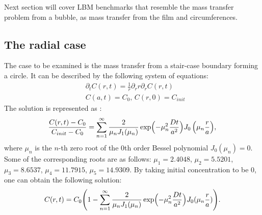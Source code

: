 \documentclass{article}
\newcommand{\beq}{\begin{equation}}
\newcommand{\feq}{\end{equation}}
\begin{document}
Next section will cover LBM benchmarks that resemble the mass transfer problem from a bubble, as 
mass transfer from the film  and circumferences.

\subsection{The radial case}
The case to be examined  is the mass transfer from a stair-case boundary forming a circle. It
can be described by the following system of equations:
\beq
\begin{aligned}
&\partial_t C(r,t)=\frac{1}{r}\partial_r r \partial_r C(r,t)\\
&C(a,t)=C_0,\,C(r,0)=C_{init}
\end{aligned}
\feq 
The solution is represented as \cite{chemical-correlations}:
\beq
\frac{C(r,t)-C_{0}}{C_{init}-C_{0}}=\sum_{n=1}^{\infty}{\frac{2}{\mu_n
J_1(\mu_n)}\exp\Bigl(-\mu_n^2 \frac{D t}{a^2} \Bigr)J_0\left(\mu_n \frac{r}{a}\right)},
\feq
where $\mu_n$ is the $n$-th zero root of the $0$th order Bessel polynomial $J_0(\mu_n)=0$. Some of
the corresponding roots are as follows: $\mu_1=2.4048$, $\mu_2=5.5201$, $\mu_3=8.6537$,
$\mu_4=11.7915$, $\mu_5=14.9309$.
By taking initial concentration to be $0$, one can obtain the following solution:
\beq
C(r,t)=C_0 \Biggl(1 - \sum_{n=1}^{\infty}{\frac{2}{\mu_n
J_1(\mu_n)}\exp\Bigl(-\mu_n^2 \frac{D t}{a^2} \Bigr)J_0(\mu_n \frac{r}{a})}\Biggr).
\feq
\end{document}
